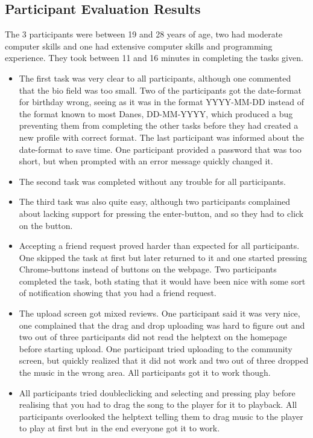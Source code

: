 \subsection{Participant Evaluation Results}
The 3 participants were between 19 and 28 years of age, two had moderate computer skills and one had extensive computer skills and programming experience. They took between 11 and 16 minutes in completing the tasks given.
\begin{itemize}
	\item The first task was very clear to all participants, although one commented that the bio field was too small. Two of the participants got the date-format for birthday wrong, seeing as it was in the format YYYY-MM-DD instead of the format known to most Danes, DD-MM-YYYY, which produced a bug preventing them from completing the other tasks before they had created a new profile with correct format. The last participant was informed about the date-format to save time. One participant provided a password that was too short, but when prompted with an error message quickly changed it.
	\item The second task was completed without any trouble for all participants.
	\item The third task was also quite easy, although two participants complained about lacking support for pressing the enter-button, and so they had to click on the button.
	\item Accepting a friend request proved harder than expected for all participants. One skipped the task at first but later returned to it and one started pressing Chrome-buttons instead of buttons on the webpage. Two participants completed the task, both stating that it would have been nice with some sort of notification showing that you had a friend request.
	\item The upload screen got mixed reviews. One participant said it was very nice, one complained that the drag and drop uploading was hard to figure out and two out of three participants did not read the helptext on the homepage before starting upload. One participant tried uploading to the community screen, but quickly realized that it did not work and two out of three dropped the music in the wrong area. All participants got it to work though.
	\item All participants tried doubleclicking and selecting and pressing play before realising that you had to drag the song to the player for it to playback. All participants overlooked the helptext telling them to drag music to the player to play at first but in the end everyone got it to work.

\end{itemize}
